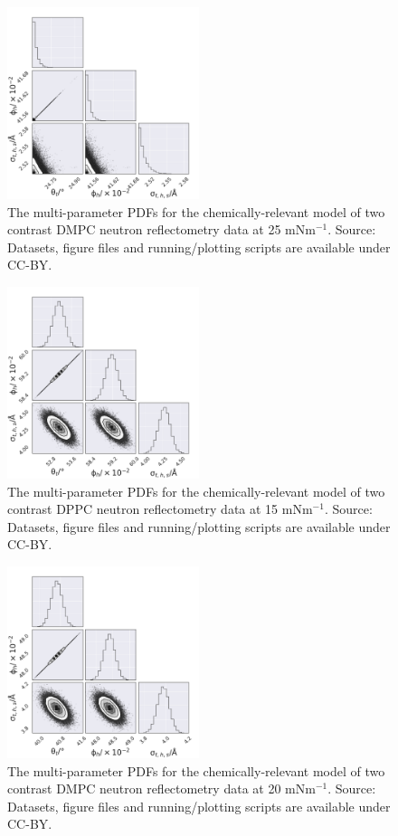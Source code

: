 \documentclass[11pt,a4paper]{article}
\begin{document}
\begin{figure}[h]
	\centering
	\includegraphics[width=0.50\textwidth]{figures/dmpc25_neutron_corner}
	\caption{The multi-parameter PDFs for the chemically-relevant model of two contrast DMPC neutron reflectometry data at 25 mNm$^{-1}$. Source: Datasets, figure files and running/plotting scripts are available under CC-BY.\cite{mccluskey_2018}}
	\label{fig:dmpcn2}
\end{figure}
\begin{figure}[h]
	\centering
	\includegraphics[width=0.50\textwidth]{figures/dppc15_neutron_corner}
	\caption{The multi-parameter PDFs for the chemically-relevant model of two contrast DPPC neutron reflectometry data at 15 mNm$^{-1}$. Source: Datasets, figure files and running/plotting scripts are available under CC-BY.\cite{mccluskey_2018}}
	\label{fig:dppcn1}
\end{figure}
\begin{figure}[h]
	\centering
	\includegraphics[width=0.50\textwidth]{figures/dppc20_neutron_corner}
	\caption{The multi-parameter PDFs for the chemically-relevant model of two contrast DMPC neutron reflectometry data at 20 mNm$^{-1}$. Source: Datasets, figure files and running/plotting scripts are available under CC-BY.\cite{mccluskey_2018}}
	\label{fig:dppcn2}
\end{figure}

\end{document}
